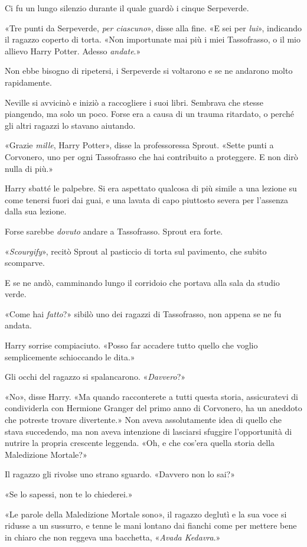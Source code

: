 Ci fu un lungo silenzio durante il quale guardò i cinque Serpeverde.

«Tre punti da Serpeverde, \textit{per ciascuno}», disse alla fine. «E sei per \textit{lui}», indicando il ragazzo coperto di torta. «Non importunate mai più i miei Tassofrasso, o il mio allievo Harry Potter. Adesso \textit{andate}.»

Non ebbe bisogno di ripetersi, i Serpeverde si voltarono e se ne andarono molto rapidamente.

Neville si avvicinò e iniziò a raccogliere i suoi libri. Sembrava che stesse piangendo, ma solo un poco. Forse era a causa di un trauma ritardato, o perché gli altri ragazzi lo stavano aiutando.

«Grazie \textit{mille}, Harry Potter», disse la professoressa Sprout. «Sette punti a Corvonero, uno per ogni Tassofrasso che hai contribuito a proteggere. E non dirò nulla di più.»

Harry sbatté le palpebre. Si era aspettato qualcosa di più simile a una lezione su come tenersi fuori dai guai, e una lavata di capo piuttosto severa per l’assenza dalla sua lezione.

Forse sarebbe \textit{dovuto} andare a Tassofrasso. Sprout era forte.

«\textit{Scourgify}», recitò Sprout al pasticcio di torta sul pavimento, che subito scomparve.

E se ne andò, camminando lungo il corridoio che portava alla sala da studio verde.

«Come hai \textit{fatto}?» sibilò uno dei ragazzi di Tassofrasso, non appena se ne fu andata.

Harry sorrise compiaciuto. «Posso far accadere tutto quello che voglio semplicemente schioccando le dita.»

Gli occhi del ragazzo si spalancarono. «\textit{Davvero}?»

«No», disse Harry. «Ma quando racconterete a tutti questa storia, assicuratevi di condividerla con Hermione Granger del primo anno di Corvonero, ha un aneddoto che potreste trovare divertente.» Non aveva assolutamente idea di quello che stava succedendo, ma non aveva intenzione di lasciarsi sfuggire l’opportunità di nutrire la propria crescente leggenda. «Oh, e che cos’era quella storia della Maledizione Mortale?»

Il ragazzo gli rivolse uno strano sguardo. «Davvero non lo sai?»

«Se lo sapessi, non te lo chiederei.»

«Le parole della Maledizione Mortale sono», il ragazzo deglutì e la sua voce si ridusse a un sussurro, e tenne le mani lontano dai fianchi come per mettere bene in chiaro che non reggeva una bacchetta, «\textit{Avada Kedavra}.»

